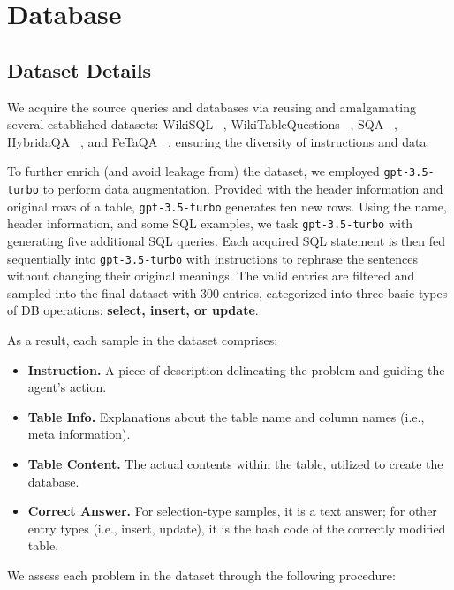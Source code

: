 \section{Database} \label{app:db}
\subsection{Dataset Details}
We acquire the source queries and databases via reusing and amalgamating several established datasets: WikiSQL ~\citep{zhongSeq2SQL2017}, WikiTableQuestions ~\citep{pasupat-liang-2015-compositional}, SQA ~\citep{iyyer-etal-2017-search-sqa}, HybridaQA ~\citep{chen-etal-2020-hybridqa}, and FeTaQA ~\citep{nan2021fetaqa}, ensuring the diversity of instructions and data.

To further enrich (and avoid leakage from) the dataset, we employed \texttt{gpt-3.5-turbo} to perform data augmentation. 
Provided with the header information and original rows of a table, \texttt{gpt-3.5-turbo} generates ten new rows. 
Using the name, header information, and some SQL examples, we task \texttt{gpt-3.5-turbo} with generating five additional SQL queries. 
Each acquired SQL statement is then fed sequentially into \texttt{gpt-3.5-turbo} with instructions to rephrase the sentences without changing their original meanings. 
The valid entries are filtered and sampled into the final dataset with 300 entries, categorized into three basic types of DB operations: \textbf{select, insert, or update}.

As a result, each sample in the dataset comprises:
\begin{itemize}[leftmargin=1.5em,itemsep=0pt,parsep=0.2em,topsep=0.0em,partopsep=0.0em]
\item \textbf{Instruction.} A piece of description delineating the problem and guiding the agent's action.
\item \textbf{Table Info.} Explanations about the table name and column names (i.e., meta information).
\item \textbf{Table Content.} The actual contents within the table, utilized to create the database.
\item \textbf{Correct Answer.} For selection-type samples, it is a text answer; for other entry types (i.e., insert, update), it is the hash code of the correctly modified table.
\end{itemize}

We assess each problem in the dataset through the following procedure:

